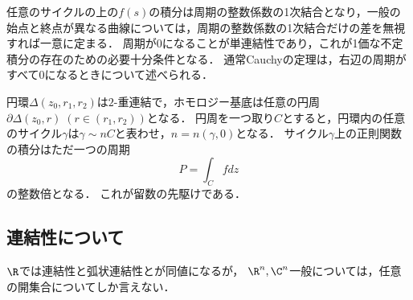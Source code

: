 \documentclass[uplatex, dvipdfmx]{jsreport}
\begin{document}
\begin{remarks}[ベクトル解析論の決着]
    任意のサイクルの上の$f(s)$の積分は周期の整数係数の1次結合となり，一般の始点と終点が異なる曲線については，周期の整数係数の1次結合だけの差を無視すれば一意に定まる．
    周期が$0$になることが単連結性であり，これが1価な不定積分の存在のための必要十分条件となる．
    通常Cauchyの定理は，右辺の周期がすべて$0$になるときについて述べられる．
\end{remarks}

\begin{example}
    円環$\Delta(z_0,r_1,r_2)$は$2$-重連結で，ホモロジー基底は任意の円周$\partial\Delta(z_0,r)\;(r\in(r_1,r_2))$となる．
    円周を一つ取り$C$とすると，円環内の任意のサイクル$\gamma$は$\gamma\sim nC$と表わせ，$n=n(\gamma,0)$となる．
    サイクル$\gamma$上の正則関数の積分はただ一つの周期
    \[P=\int_Cfdz\]
    の整数倍となる．
    これが留数の先駆けである．
\end{example}

\subsection{連結性について}

\begin{tcolorbox}[colframe=ForestGreen, colback=ForestGreen!10!white,breakable,colbacktitle=ForestGreen!40!white,coltitle=black,fonttitle=\bfseries\sffamily,
title=]
    $\R$では連結性と弧状連結性とが同値になるが，
    $\R^n,\C^n$一般については，任意の開集合についてしか言えない．
\end{tcolorbox}
\end{document}
